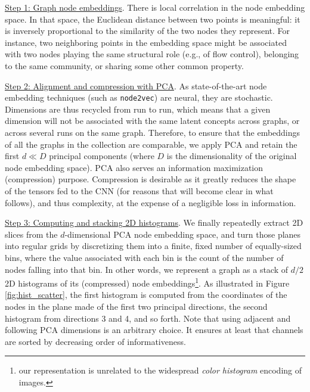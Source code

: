 \documentclass[sigconf]{acmart}
\begin{document}
\vspace{-0.28cm}

\underline{Step 1: Graph node embeddings}. There is local correlation in the node embedding space. In that space, the Euclidean distance between two points is meaningful: it is inversely proportional to the similarity of the two nodes they represent. For instance, two neighboring points in the embedding space might be associated with two nodes playing the same structural role (e.g., of flow control), belonging to the same community, or sharing some other common property.\\

\vspace{-0.2cm}

\underline{Step 2: Alignment and compression with PCA}. As state-of-the-art node embedding techniques (such as \texttt{node2vec}) are neural, they are stochastic. Dimensions are thus recycled from run to run, which means that a given dimension will not be associated with the same latent concepts across graphs, or across several runs on the same graph. Therefore, to ensure that the embeddings of all the graphs in the collection are comparable, we apply PCA and retain the first $d \ll D$ principal components (where $D$ is the dimensionality of the original node embedding space). PCA also serves an information maximization (compression) purpose. Compression is desirable as it greatly reduces the shape of the tensors fed to the CNN (for reasons that will become clear in what follows), and thus complexity, at the expense of a negligible loss in information.\\

\vspace{-0.2cm}

\underline{Step 3: Computing and stacking 2D histograms}. We finally repeatedly extract 2D slices from the $d$-dimensional PCA node embedding space, and turn those planes into regular grids by discretizing them into a finite, fixed number of equally-sized bins, where the value associated with each bin is the count of the number of nodes falling into that bin. In other words, we represent a graph as a stack of $d/2$ 2D histograms of its (compressed) node embeddings\footnote{\scriptsize{our representation is unrelated to the widespread \textit{color histogram} encoding of images.}}. As illustrated in Figure \ref{fig:hist_scatter}, the first histogram is computed from the coordinates of the nodes in the plane made of the first two principal directions, the second histogram from directions 3 and 4, and so forth. Note that using adjacent and following PCA dimensions is an arbitrary choice. It ensures at least that channels are sorted by decreasing order of informativeness.
\end{document}
